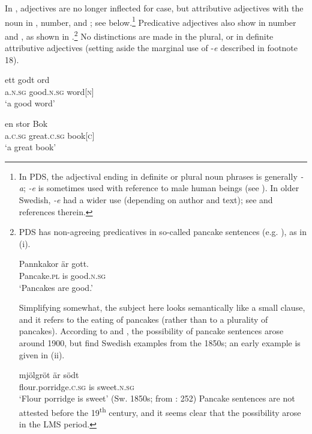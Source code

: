 \documentclass[output=paper]{langscibook}
\begin{document}
In , adjectives are no longer inflected for case, but attributive adjectives  with the noun in , number, and ; see  below.\footnote{In PDS, the adjectival ending in definite or plural noun phrases is generally \textit{{}-a}; \textit{{}-e} is sometimes used with reference to male human beings (see \citealt{Bylin2016}). In older Swedish, \textit{{}-e} had a wider use (depending on author and text); see \citet{Larsson2004} and references therein.}  Predicative adjectives also show  in number and , as shown in .\footnote{PDS has non-agreeing predicatives in so-called pancake sentences (e.g. \citealt{Josefsson2009}), as in (i).

\ea
\gll  Pannkakor   är   gott. \\
Pancake\textsc{.pl}  is   good\textsc{.n.sg}\\
\glt ‘Pancakes are good.’
\z

Simplifying somewhat, the subject here looks semantically like a small clause, and it refers to the eating of pancakes (rather than to a plurality of pancakes). According to \citet{Faarlund1977} and \citet{Josefsson2014}, the possibility of pancake sentences arose around 1900, but \citet{HaugenEtAl2019} find Swedish examples from the 1850s; an early example is given in (ii).

\ea \gll mjölgröt     är södt\\
        flour.porridge\textsc{.c.sg}   is sweet\textsc{.n.sg}\\
        \glt ‘Flour porridge is sweet’ (Sw. 1850s; from \citealt{HaugenEtAl2019}: 252)
\z Pancake sentences are not attested before the 19\textsuperscript{th} century, and it seems clear that the possibility arose in the LMS period.} No  distinctions are made in the plural, or in definite attributive adjectives (setting aside the marginal use of -\textit{e} described in footnote 18).


\ea\label{ex:intro:35}
\ea\label{ex:intro:35b}
\gll  ett       godt         ord\\
a.\textsc{n.sg}  good.\textsc{n.sg}  word[\textsc{n]}\\
\glt ‘a good word’

\ex\label{ex:intro:35a}
\gll  en       stor           Bok \\
a.\textsc{c.sg}  great.\textsc{c.sg}  book[\textsc{c]}\\
\glt ‘a great book’
\end{document}
